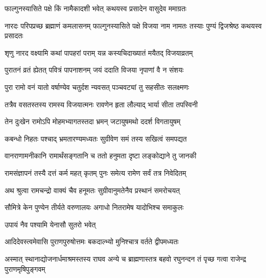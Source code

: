 \ganapatyadiDhyanam
\padmaPuranam



\twolineshloka
{फाल्गुनस्यासिते पक्षे किं नामैकादशी भवेत्}
{कथयस्व प्रसादेन वासुदेव ममाग्रतः}%


\threelineshloka
{नारदः परिपप्रच्छ ब्रह्माणं कमलासनम्}
{फाल्गुनस्यासिते पक्षे विजया नाम नामतः}
{तस्याः पुण्यं द्विजश्रेष्ठ कथयस्व प्रसादतः}%


\twolineshloka
{शृणु नारद वक्ष्यामि कथां पापहरां पराम्}
{यन्न कस्यचिदाख्यातं मयैतद् विजयाव्रतम्}%

\twolineshloka
{पुरातनं व्रतं ह्येतत् पवित्रं पापनाशनम्}
{जयं ददाति विजया नृपाणां वै न संशयः}%

\twolineshloka
{पुरा रामो वनं यातो वर्षाण्येव चतुर्दश}
{न्यवसत् पञ्चवट्यां तु  सहसीतः सलक्ष्मणः}%

\twolineshloka
{तत्रैव वसतस्तस्य रामस्य विजयात्मनः}
{रावणेन हृता लौल्याद् भार्या सीता तपस्विनी}%

\twolineshloka
{तेन दुःखेन रामोऽपि मोहमभ्यागतस्तदा}
{भ्रमन् जटायुषमथो ददर्श विगतायुषम्}%

\twolineshloka
{कबन्धो निहतः पश्चाद् भ्रमतारण्यमध्यतः}
{सुग्रीवेण समं तस्य सखित्वं समपद्यत}%

\twolineshloka
{वानराणामनीकानि रामार्थंसङ्गतानि च}
{ततो हनुमता दृष्टा लङ्कोद्याने तु जानकी}%

\twolineshloka
{रामसंज्ञापनं तस्यै दत्तं कर्म महत् कृतम्}
{पुनः समेत्य रामेण सर्वं तत्र निवेदितम्}%

\twolineshloka
{अथ श्रुत्वा रामचन्द्रो वाक्यं चैव हनूमतः}
{सुग्रीवानुमतेनैव प्रस्थानं समरोचयत्}%


\twolineshloka
{सौमित्रे केन पुण्येन तीर्यते वरुणालयः}
{अगाधो नितरामेष यादोभिश्च समाकुलः}%

\onelineshloka
{उपायं नैव पश्यामि येनासौ सुतरो भवेत्}%


\twolineshloka
{आदिदेवस्त्वमेवासि पुराणपुरुषोत्तमः}
{बकदाल्भ्यो मुनिश्चात्र वर्तते द्वीपमध्यतः}%

\threelineshloka
{अस्मात् स्थानाद्योजनार्धमाश्रमस्तस्य राघव}
{अन्ये च ब्राह्मणास्तत्र बहवो रघुनन्दन}
{तं पृच्छ गत्वा राजेन्द्र पुराणमृषिपुङ्गवम्}%

